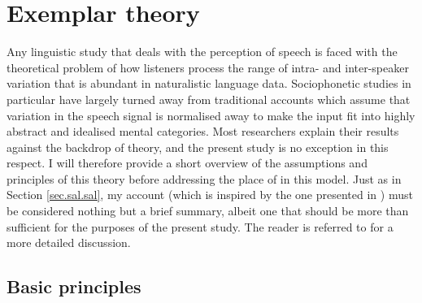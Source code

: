 	\section{Exemplar theory}
	\label{sec.sal.exemplar}

Any linguistic study that deals with the perception of speech is faced with the theoretical problem of how listeners process the range of intra- and inter-speaker variation that is abundant in naturalistic language data.
Sociophonetic studies in particular have largely turned away from traditional accounts which assume that variation in the speech signal is normalised away to make the input fit into highly abstract and idealised mental categories.
Most researchers explain their results against the backdrop of  theory, and the present study is no exception in this respect.
I will therefore provide a short overview of the assumptions and principles of this theory before addressing the place of  in this model.
Just as in Section \ref{sec.sal.sal}, my account (which is inspired by the one presented in \citealt{juskanma}) must be considered nothing but a brief summary, albeit one that should be more than sufficient for the purposes of the present study.
The reader is referred to \citealt{pierrehumbert2006} for a more detailed discussion.

		\subsection{Basic principles}
		\label{sec.sal.exemplar.basic}
		
